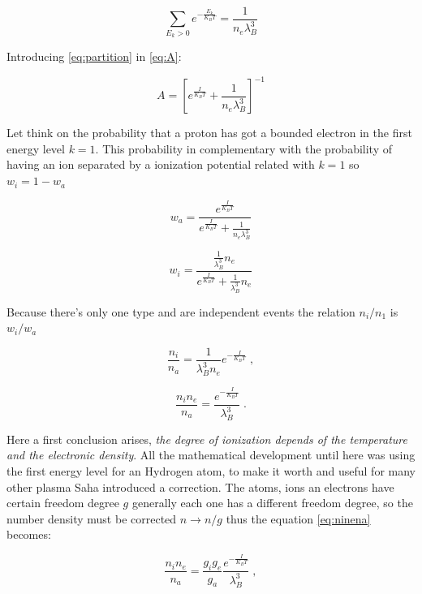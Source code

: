 \documentclass[spanish,notitlepage,letterpaper,11pt]{article} %
\numberwithin{equation}{subsection}
\begin{document}
    \begin{equation}\label{eq:partition}
        \sum_{E_k > 0}e^{-\frac{E_k}{K_BT}} = \frac{1}{n_e\lambda_B^3}
    \end{equation}

    Introducing \ref{eq:partition} in \ref{eq:A}:

    \begin{equation}
        A = \left[e^{\frac{I}{K_BT}} + \frac{1}{n_e\lambda_B^3}\right]^{-1}
    \end{equation}

    Let think on the probability that a proton has got a bounded electron in the first energy level $k=1$. This probability in complementary with the probability of having an ion separated by a ionization potential related with $k=1$ so $w_i = 1 - w_a$

    \begin{equation}\label{eq:ProbProt}
        w_a = \frac{e^{\frac{I}{K_BT}}}{e^{\frac{I}{K_BT}} + \frac{1}{n_e\lambda_B^3}}
    \end{equation}

    \begin{equation}\label{eq:ProbIon}
        w_i = \frac{\frac{1}{\lambda_B^3}n_e}{e^{\frac{I}{K_BT}} + \frac{1}{\lambda_B^3}n_e}
    \end{equation}

    Because there's only one type and are independent events the relation $n_i/n_1$ is $w_i/w_a$

    \begin{equation*}
        \frac{n_i}{n_a} = \frac{1}{\lambda_B^3n_e}e^{-\frac{I}{K_BT}}\;,
    \end{equation*}

    \begin{equation}\label{eq:ninena}
        \frac{n_in_e}{n_a} = \frac{e^{-\frac{I}{K_BT}}}{\lambda_B^3}\;.
    \end{equation}

    Here a first conclusion arises, \textit{the degree of ionization depends of the temperature and the electronic density}. All the mathematical development until here was using the first energy level for an Hydrogen atom, to make it worth and useful for many other plasma Saha introduced a correction. The atoms, ions an electrons have certain freedom degree $g$ generally each one has a different freedom degree, so the number density must be corrected $n \rightarrow n/g$ thus the equation \ref{eq:ninena}  becomes:

    \begin{equation}
        \frac{n_in_e}{n_a} = \frac{g_ig_e}{g_a}\frac{e^{-\frac{I}{K_BT}}}{\lambda_B^3}\;,
    \end{equation}
\end{document}
